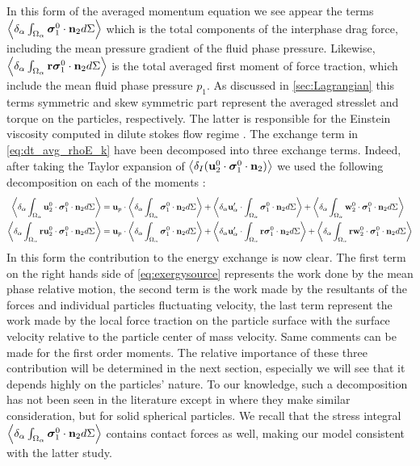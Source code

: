 In this form of the averaged momentum equation we see appear the terms $\left<\delta_\alpha \int_{\Omega_\alpha} \bm{\sigma}_1^0 \cdot \textbf{n}_2 d\Sigma\right>$ which is the total components of the interphase drag force, including the mean pressure gradient of the fluid phase pressure. 
Likewise, $\left<\delta_\alpha \int_{\Omega_\alpha} \textbf{r}\bm{\sigma}_1^0 \cdot \textbf{n}_2 d\Sigma\right>$ is the total averaged first moment of force traction, which include the mean fluid phase pressure $p_1$. 
As discussed in \ref{sec:Lagrangian} this terms symmetric and skew symmetric part represent the averaged stresslet and torque on the particles, respectively.  
The latter is responsible for the Einstein viscosity computed in dilute stokes flow regime \citep{guazzelli2011}. 
The exchange term in \ref{eq:dt_avg_rhoE_k} have been decomposed into three exchange terms.
Indeed, after taking the Taylor expansion of $\left<\delta_I (\textbf{u}^0_2 \cdot \bm{\sigma}_1^0 \cdot \textbf{n}_2)\right>$  we used the following decomposition on each of the moments :
\begin{align}
    \label{eq:exergysource}
    \left<\delta_\alpha  \int_{\Omega_\alpha} \textbf{u}^0_2 \cdot \bm{\sigma}_1^0 \cdot \textbf{n}_2 d\Sigma\right>
    &= 
    \textbf{u}_p \cdot \left<\delta_\alpha \int_{\Omega_\alpha} {\bm{\sigma}_1^0 \cdot \textbf{n}_2} d\Sigma\right>
    + \left<\delta_\alpha  \textbf{u}_\alpha' \cdot \int_{\Omega_\alpha}   \bm{\sigma}_1^0 \cdot \textbf{n}_2 d\Sigma\right>
    + \left<\delta_\alpha  \int_{\Omega_\alpha} \textbf{w}_2^0 \cdot \bm{\sigma}_1^0 \cdot \textbf{n}_2 d\Sigma\right>\\
    \left<\delta_\alpha  \int_{\Omega_\alpha} \textbf{r}\textbf{u}^0_2 \cdot \bm{\sigma}_1^0 \cdot \textbf{n}_2 d\Sigma\right>
   &= 
    \textbf{u}_p \cdot \left<\delta_\alpha \int_{\Omega_\alpha} {\bm{\sigma}_1^0 \cdot \textbf{n}_2} d\Sigma\right>
    + \left<\delta_\alpha  \textbf{u}_\alpha' \cdot \int_{\Omega_\alpha} \textbf{r}  \bm{\sigma}_1^0 \cdot \textbf{n}_2 d\Sigma\right>
    + \left<\delta_\alpha  \int_{\Omega_\alpha} \textbf{r}\textbf{w}_2^0 \cdot \bm{\sigma}_1^0 \cdot \textbf{n}_2 d\Sigma\right>
\end{align}
In this form the contribution to the energy exchange is now clear. 
The first term on the right hands side of \ref{eq:exergysource} represents the work done by the mean phase relative motion, the second term is the work made by the resultants of the forces and individual particles fluctuating velocity, the last term represent the work made by the local force traction on the particle surface with the surface velocity relative to the particle center of mass velocity.
Same comments can be made for the first order moments. 
The relative importance of these three contribution will be determined in the next section, especially we will see that  it depends highly on the particles' nature. 
To our knowledge, such a decomposition has not been seen in the literature except in \citep[Chapter 2]{scorsim2021particle} where they make similar consideration, but for solid spherical particles.
We recall that the stress integral $\left<\delta_\alpha \int_{\Omega_\alpha} \bm{\sigma}_1^0 \cdot \textbf{n}_2 d\Sigma\right>$ contains contact forces as well, making our model consistent with the latter study. 

